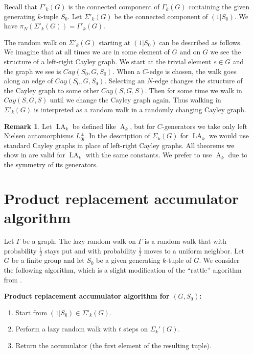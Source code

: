 \documentclass[12pt]{amsart}
\theoremstyle{definition}
\newtheorem{remark}[theorem]{Remark}
\numberwithin{figure}{section}
\numberwithin{table}{section}
\numberwithin{equation}{section}
\newcommand{\OP}[1]{\operatorname{#1}}
\newcommand{\A}{\operatorname{A}}
\begin{document}
Recall that $\Gamma'_k(G)$ is the connected component of $\Gamma_k(G)$ containing the given generating $k$-tuple $S_0$. Let  $\Sigma'_k(G)$ be the connected component of $(1|S_0)$. We have $\pi_N(\Sigma'_k(G)) = \Gamma'_k(G)$.

The random walk on $\Sigma'_k(G)$ starting at $(1|S_0)$ can be described as follows. We imagine that at all times we are in some element of $G$ and on $G$ we see the structure of a left-right Cayley graph. We start at the trivial element $e \in G$ and the graph we see is $Cay(S_0,G,S_0)$. 
When a $C$-edge is chosen, the walk goes along an edge of $Cay(S_0,G,S_0)$.
Selecting an $N$-edge changes the structure of the Cayley graph to some other $Cay(S,G,S)$. Then for some time we walk in $Cay(S,G,S)$ until we change the Cayley graph again. 
Thus walking in $\Sigma'_k(G)$ is interpreted as a random walk in a randomly changing Cayley graph. 

\begin{remark}\label{r:only-left-transvections}
Let \marginnote{$\OP{LA}_k$} $\OP{LA}_k$ be defined like $\A_k$, but for $C$-generators we take only left Nielsen automorphisms $L_{0i}^\pm$. In the description of $\Sigma_k(G)$   for $\OP{LA}_k$ we would use standard Cayley graphs in place of left-right Cayley graphs. All theorems we show in  are valid for $\OP{LA}_k$ with the same constants. We prefer to use $\A_k$ due to the symmetry of its generators.  
\end{remark}

\section{Product replacement accumulator algorithm}\label{s:praa}

Let $\Gamma$ be a graph. The lazy random walk on $\Gamma$ is a random walk that with probability $\frac{1}{2}$ stays put and with probability $\frac{1}{2}$ moves to a uniform neighbor. Let $G$ be a finite group and let $S_0$ be a given generating $k$-tuple of $G$. We consider the following algorithm, which is a slight modification of the ``rattle'' algorithm from \cite{MR1929718}.

\textbf{Product replacement accumulator algorithm for $(G,S_0)$:}

\begin{enumerate}
\item Start from $(1|S_0) \in \Sigma'_k(G)$.
\item Perform a lazy random walk with $t$ steps on $\Sigma_k'(G)$.
\item Return the accumulator (the first element of the resulting tuple).
\end{enumerate}
\end{document}
